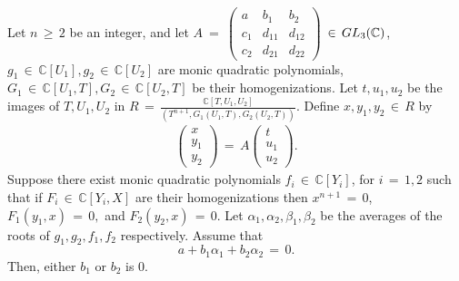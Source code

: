 \documentclass[10pt,a4paper]{amsart}
\begin{document}
\begin{lemma}\label{alg}
Let $n\,\geq\, 2$ be an integer, and let $A$ \,=\,  $ \begin{pmatrix}
    a & b_{1} & b_{2} \\
    c_{1} & d_{11} & d_{12}\\
    c_{2} & d_{21} & d_{22}
\end{pmatrix}$ 
$\,\in\, \textnormal{GL}_{3}(\mathbb{C})$, $g_{1}\,\in\, \mathbb{C}[U_{1}], g_{2}\,\in\, \mathbb{C}[U_{2}]$ are monic quadratic polynomials, $G_{1} \,\in\, \mathbb{C}[U_{1}, T], G_{2}\,\in\, \mathbb{C}[U_{2}, T]$ be their homogenizations. Let $t, u_{1}, u_{2}$ be the images of $T, U_{1}, U_{2}$ in $ R\,=\,\frac{\mathbb{C}[T, U_{1}, U_{2}]}{(T^{n+1}, G_{1}(U_{1}, T), G_{2}(U_{2}, T))}.$ Define $x, y_1, y_2\,\in\, R$ by \begin{gather}
\begin{pmatrix}
    x \\
    y_{1}\\
    y_{2}
\end{pmatrix}
\,=\,
A
\begin{pmatrix}
    t \\
    u_{1}\\
    u_{2}
\end{pmatrix}.
\end{gather} Suppose there exist monic quadratic polynomials $f_{i}\,\in\, \mathbb{C}[Y_{i}]$, for $i \,=\, 1, 2$ such that if $F_{i}\,\in\, \mathbb{C}[Y_{i}, X]$ are their homogenizations then $x^{n+1} \,=\, 0$, $F_{1}(y_{1}, x) \,=\, 0,$ and $ F_{2}(y_{2}, x) \,=\, 0. $ Let $ \alpha_{1},\alpha_{2},\beta_{1},\beta_{2}$ be the averages of the roots of $g_1, g_2, f_1, f_2$ respectively. Assume that 
\begin{equation*}
a+b_1\alpha_1+b_2\alpha_2\,=\,0.
\end{equation*}
Then, either $b_1$ or $b_2$ is $0.$
\end{lemma}
\end{document}
